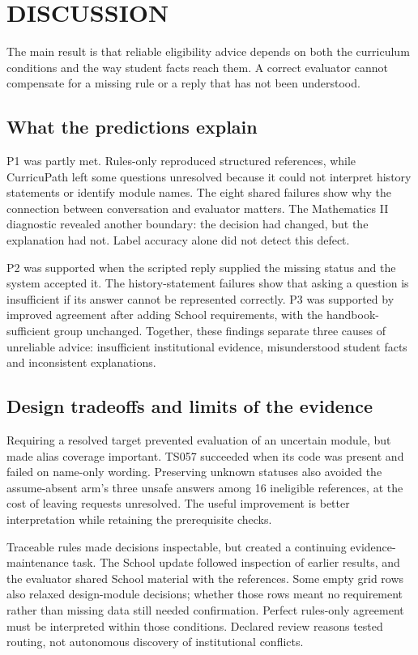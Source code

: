 \section{DISCUSSION}
The main result is that reliable eligibility advice depends on both the curriculum conditions and the way student facts reach them. A correct evaluator cannot compensate for a missing rule or a reply that has not been understood.

\subsection{What the predictions explain}
P1 was partly met. Rules-only reproduced structured references, while CurricuPath left some questions unresolved because it could not interpret history statements or identify module names. The eight shared failures show why the connection between conversation and evaluator matters. The Mathematics II diagnostic revealed another boundary: the decision had changed, but the explanation had not. Label accuracy alone did not detect this defect.

P2 was supported when the scripted reply supplied the missing status and the system accepted it. The history-statement failures show that asking a question is insufficient if its answer cannot be represented correctly. P3 was supported by improved agreement after adding School requirements, with the handbook-sufficient group unchanged. Together, these findings separate three causes of unreliable advice: insufficient institutional evidence, misunderstood student facts and inconsistent explanations.

\subsection{Design tradeoffs and limits of the evidence}
Requiring a resolved target prevented evaluation of an uncertain module, but made alias coverage important. TS057 succeeded when its code was present and failed on name-only wording. Preserving unknown statuses also avoided the assume-absent arm's three unsafe answers among 16 ineligible references, at the cost of leaving requests unresolved. The useful improvement is better interpretation while retaining the prerequisite checks.

Traceable rules made decisions inspectable, but created a continuing evidence-maintenance task. The School update followed inspection of earlier results, and the evaluator shared School material with the references. Some empty grid rows also relaxed design-module decisions; whether those rows meant no requirement rather than missing data still needed confirmation. Perfect rules-only agreement must be interpreted within those conditions. Declared review reasons tested routing, not autonomous discovery of institutional conflicts.

